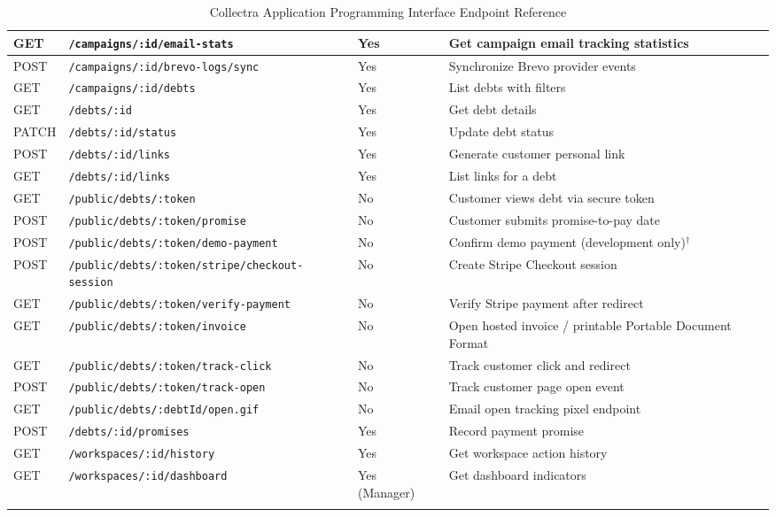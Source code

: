 \documentclass[12pt,a4paper]{report}
\newcommand{\apitablecols}{|p{1.2cm}|p{4.95cm}|p{2.25cm}|p{5.05cm}|}
\begin{document}
{\begin{longtable}{\apitablecols}
  \hline
  GET   & \texttt{/campaigns/:id/email-stats}        & Yes            & Get campaign email tracking statistics \\
  \hline
  POST  & \texttt{/campaigns/:id/brevo-logs/sync}    & Yes            & Synchronize Brevo provider events \\
  \hline
  GET   & \texttt{/campaigns/:id/debts}              & Yes            & List debts with filters \\
  \hline
  GET   & \texttt{/debts/:id}                        & Yes            & Get debt details \\
  \hline
  PATCH & \texttt{/debts/:id/status}                 & Yes            & Update debt status \\
  \hline
  POST  & \texttt{/debts/:id/links}                  & Yes            & Generate customer personal link \\
  \hline
  GET   & \texttt{/debts/:id/links}                  & Yes            & List links for a debt \\
  \hline
  GET   & \texttt{/public/debts/:token}              & No             & Customer views debt via secure token \\
  \hline
  POST  & \texttt{/public/debts/:token/promise}      & No             & Customer submits promise-to-pay date \\
  \hline
  POST  & \texttt{/public/debts/:token/demo-payment} & No             & Confirm demo payment (development only)$^{\dagger}$ \\
  \hline
  POST  & \texttt{/public/debts/:token/stripe/checkout-session} & No & Create Stripe Checkout session \\
  \hline
  GET   & \texttt{/public/debts/:token/verify-payment} & No           & Verify Stripe payment after redirect \\
  \hline
  GET   & \texttt{/public/debts/:token/invoice}      & No             & Open hosted invoice / printable Portable Document Format \\
  \hline
  GET   & \texttt{/public/debts/:token/track-click}  & No             & Track customer click and redirect \\
  \hline
  POST  & \texttt{/public/debts/:token/track-open}   & No             & Track customer page open event \\
  \hline
  GET   & \texttt{/public/debts/:debtId/open.gif}    & No             & Email open tracking pixel endpoint \\
  \hline
  POST  & \texttt{/debts/:id/promises}               & Yes            & Record payment promise \\
  \hline
  GET   & \texttt{/workspaces/:id/history}           & Yes            & Get workspace action history \\
  \hline
  GET   & \texttt{/workspaces/:id/dashboard}         & Yes (Manager)  & Get dashboard indicators \\
  \hline
  \caption{Collectra Application Programming Interface Endpoint Reference}
  \label{tab:api-endpoints}
\end{longtable}
}
\end{document}
